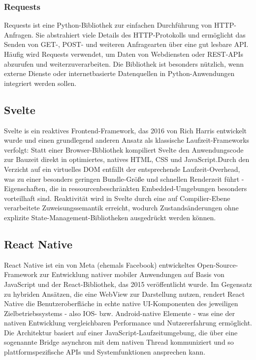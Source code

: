 \subsubsection{Requests}
Requests ist eine Python-Bibliothek zur einfachen Durchführung von HTTP-Anfragen. Sie abstrahiert viele Details des HTTP-Protokolls und ermöglicht das Senden von GET-, POST- und weiteren Anfragearten über eine gut lesbare API. Häufig wird Requests verwendet, um Daten von Webdiensten oder REST-APIs abzurufen und weiterzuverarbeiten. Die Bibliothek ist besonders nützlich, wenn externe Dienste oder internetbasierte Datenquellen in Python-Anwendungen integriert werden sollen.\autocite[vgl.]{RequestsHTTPHumans}

\subsection{Svelte}
\label{subsec:Svelte}
Svelte is ein reaktives Frontend-Framework, das 2016 von Rich Harris entwickelt wurde und einen grundlegend anderen Ansatz als klassische Laufzeit-Frameworks verfolgt: Statt einer Browser-Bibliothek kompiliert Svelte den Anwendungscode zur Bauzeit direkt in optimiertes, natives HTML, CSS und JavaScript.\autocite[vgl.]{harrisSvelteRethinkingReactivity2019}Durch den Verzicht auf ein virtuelles \ac{DOM} entfällt der entsprechende Laufzeit-Overhead, was zu einer besonders geringen Bundle-Größe und schnellen Renderzeit führt - Eigenschaften, die in ressourcenbeschränkten Embedded-Umgebungen besonders vorteilhaft sind. Reaktivität wird in Svelte durch eine auf Compilier-Ebene verarbeitete Zuweisungssemantik erreicht, wodurch Zustandsänderungen ohne explizite State-Management-Bibliotheken ausgedrückt werden können.\autocite[vgl.]{DocsSvelte}

\newpage
\subsection{React Native}
\label{subsec:React}
React Native ist ein von Meta (ehemals Facebook) entwickeltes Open-Source-Framework zur Entwicklung nativer mobiler Anwendungen auf Basis von JavaScript und der React-Bibliothek, das 2015 veröffentlicht wurde. Im Gegensatz zu hybriden Ansätzen, die eine WebView zur Darstellung nutzen, rendert React Native die Benutzeroberfläche in echte native UI-Komponenten des jeweiligen Zielbetriebssystems - also IOS- bzw. Android-native Elemente - was eine der nativen Entwicklung vergleichbaren Performance und Nutzererfahrung ermöglicht. Die Architektur basiert auf einer JavaScript-Laufzeitumgebung, die über eine sogenannte Bridge asynchron mit dem nativen Thread kommuniziert und so plattformspezifische APIs und Systemfunktionen ansprechen kann. \autocite[vgl.]{ReactNativeLearn}

